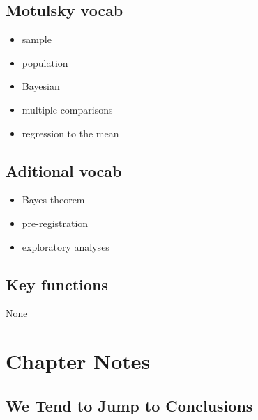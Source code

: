 \documentclass[]{book}
\providecommand{\tightlist}{%
  \setlength{\itemsep}{0pt}\setlength{\parskip}{0pt}}
\theoremstyle{definition}
\theoremstyle{definition}
\theoremstyle{definition}
\theoremstyle{remark}
\begin{document}
\subsection{Motulsky vocab}\label{motulsky-vocab}

\begin{itemize}
\tightlist
\item
  sample
\item
  population
\item
  Bayesian
\item
  multiple comparisons
\item
  regression to the mean
\end{itemize}

\subsection{Aditional vocab}\label{aditional-vocab}

\begin{itemize}
\tightlist
\item
  Bayes theorem
\item
  pre-registration
\item
  exploratory analyses
\end{itemize}

\subsection{Key functions}\label{key-functions}

None

\section*{Chapter Notes}\label{chapter-notes}

\subsection{We Tend to Jump to
Conclusions}\label{we-tend-to-jump-to-conclusions}
\end{document}
